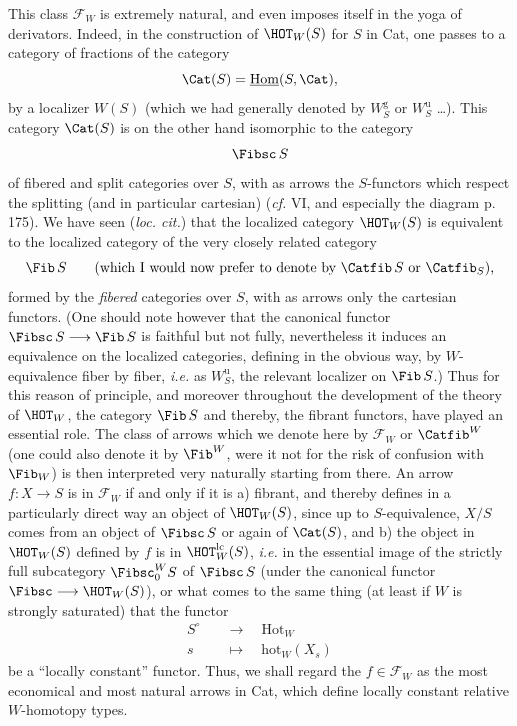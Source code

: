 
This class $\mathcal{F}_W$ is extremely natural, and even imposes itself in the yoga of derivators. Indeed, in the construction of $\HOT_W(S)$ for $S$ in Cat, one passes to a category of fractions of the category
\[
\Cat(S) = \underline{\mathrm{Hom}}(S, \Cat),
\]
by a localizer $W(S)$ (which we had generally denoted by $W_S^{\mathrm{g}}$ or $W_S^{\mathrm{u}}$ \ldots). This category $\Cat(S)$ is on the other hand isomorphic to the category
\[
\Fibsc\, S
\]
of fibered and split categories over $S$, with as arrows the $S$-functors which respect the splitting (and in particular cartesian) (\textit{cf.} VI, and especially the diagram p. 175). We have seen (\textit{loc. cit.}) that the localized category $\HOT_W(S)$ is equivalent to the localized category of the very closely related category
\[
\Fib\, S \qquad \text{(which I would now prefer to denote by $\Catfib\, S$ or $\Catfib_S$),}
\]
formed by the \textit{fibered} categories over $S$, with as  arrows only the cartesian functors. (One should note however that the canonical functor $\Fibsc\, S \longrightarrow \Fib\, S$ is faithful but not fully, nevertheless it induces an equivalence on the localized categories, defining in the obvious way, by $W$-equivalence fiber by fiber, \textit{i.e.} as $W_S^{\mathrm{u}}$, the relevant localizer on $\Fib\, S$.) Thus for this reason of principle, and moreover throughout the development of the theory of $\HOT_W$, the category $\Fib\, S$ and thereby, the fibrant functors, have played an essential role. The class of arrows which we denote here by $\mathcal{F}_W$ or $\Catfib^W$ (one could also denote it by $\Fib^W$, were it not for the risk of confusion with $\Fib_W$) is then interpreted very naturally starting from there. An arrow $f : X \longrightarrow S$ is in $\mathcal{F}_W$ if and only if it is a) fibrant, and thereby defines in a particularly direct way an object of $\HOT_W(S)$, since up to $S$-equivalence, $X/S$ comes from an object of $\Fibsc\, S$ or again of $\Cat(S)$,  and b) the object in $\HOT_W(S)$ defined by $f$ is in $\HOT_W^{\mathrm{lc}}(S)$, \textit{i.e.} in the essential image of the strictly full subcategory $\Fibsc_0^W S$ of $\Fibsc\, S$ (under the canonical functor
$\Fibsc \longrightarrow \HOT_W(S)$), or what comes to the same thing (at least if $W$ is strongly saturated) that the functor %
\[
\begin{aligned}
S^{\circ} \quad &\longrightarrow \quad \mathrm{Hot}_W \\
s \quad &\longmapsto \quad \mathrm{hot}_W(X_s)
\end{aligned}
\]
be a ``locally constant'' functor. Thus, we shall regard the $f \in \mathcal{F}_W$ as the most economical and most natural arrows in Cat, which define locally constant relative $W$-homotopy types.

